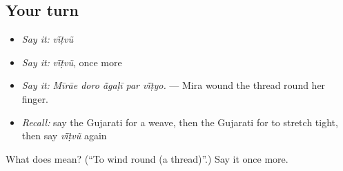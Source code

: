 \subsection*{Your turn}
\begin{itemize}
\raggedright
  \item \emph{Say it:} \emph{vī̃ṭvũ}
  \item \emph{Say it:} \emph{vī̃ṭvũ}, once more
  \item \emph{Say it:} \emph{Mīrāe doro ā̃gaḷī par vī̃ṭyo.} — Mira wound the thread round her finger.
  \item \emph{Recall:} say the Gujarati for a weave, then the Gujarati for to stretch tight, then say \emph{vī̃ṭvũ} again
\end{itemize}

\begin{tcolorbox}[breakable,colback=teal!4,colframe=teal!35!black,title={Before you move on}]
What does  mean? (\textquotedblleft{}To wind round (a thread)\textquotedblright{}.) Say it once more.
\end{tcolorbox}

